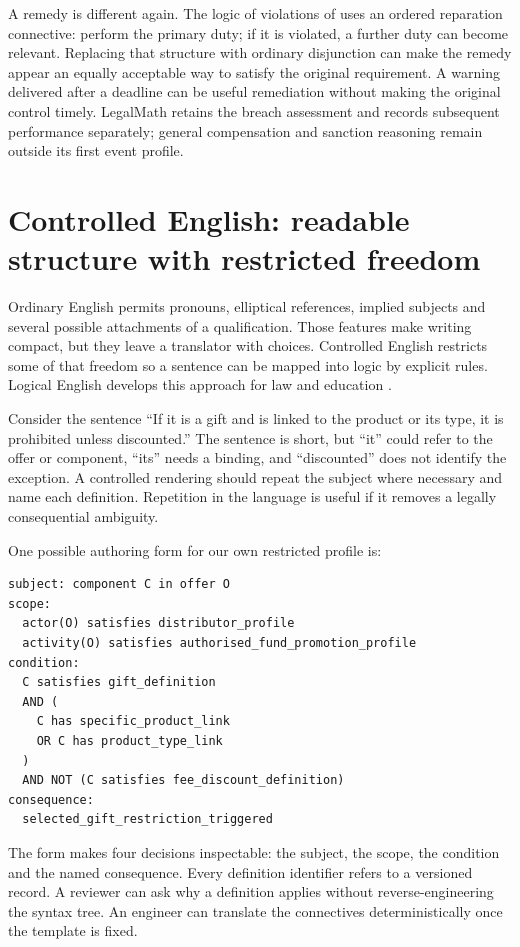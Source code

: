 \documentclass[12pt,a4paper,oneside,openany]{book}
\begin{document}
A remedy is different again. The logic of violations of
\citet[secs.~2--5]{violations2006} uses an ordered reparation connective: perform
the primary duty; if it is violated, a further duty can become relevant.
Replacing that structure with ordinary disjunction can make the remedy appear
an equally acceptable way to satisfy the original requirement. A warning delivered
after a deadline can be useful remediation without making the original control
timely. LegalMath retains the breach assessment and records subsequent performance
separately; general compensation and sanction reasoning remain outside its first
event profile.

\section{Controlled English: readable structure with restricted freedom}
\label{merge:M04:02}

\label{sec:languages-logicalenglish}
Ordinary English permits pronouns, elliptical references, implied subjects and
several possible attachments of a qualification. Those features make writing
compact, but they leave a translator with choices. Controlled English restricts
some of that freedom so a sentence can be mapped into logic by explicit rules.
Logical English develops this approach for law and education
\citep[language specification and examples]{logicalenglish2023}.

Consider the sentence ``If it is a gift and is linked to the product or its
type, it is prohibited unless discounted.'' The sentence is short, but ``it''
could refer to the offer or component, ``its'' needs a binding, and ``discounted''
does not identify the exception. A controlled rendering should repeat the
subject where necessary and name each definition. Repetition in the language
is useful if it removes a legally consequential ambiguity.

One possible authoring form for our own restricted profile is:
\begin{lstlisting}[caption={Illustrative LegalMath authoring notation. This is a proposed template, not claimed to be valid Logical English or Catala source.}]
subject: component C in offer O
scope:
  actor(O) satisfies distributor_profile
  activity(O) satisfies authorised_fund_promotion_profile
condition:
  C satisfies gift_definition
  AND (
    C has specific_product_link
    OR C has product_type_link
  )
  AND NOT (C satisfies fee_discount_definition)
consequence:
  selected_gift_restriction_triggered
\end{lstlisting}
The form makes four decisions inspectable: the subject, the scope, the
condition and the named consequence. Every definition identifier refers to
a versioned record. A reviewer can ask why a definition applies without
reverse-engineering the syntax tree. An engineer can translate the connectives
deterministically once the template is fixed.
\end{document}
